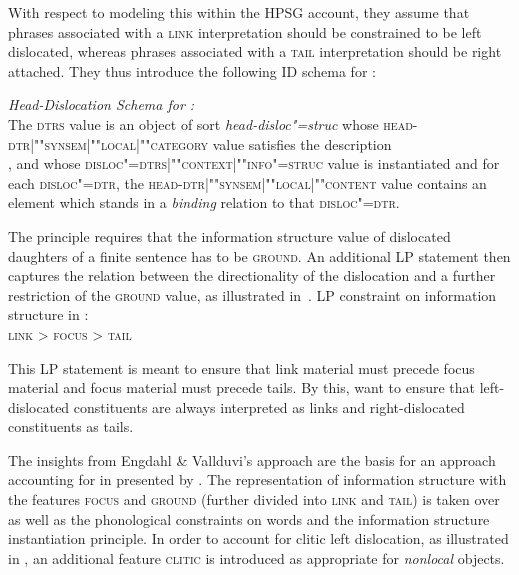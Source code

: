 \documentclass[output=paper
 	        ,biblatex
                ,babelshorthands
                ,newtxmath
                ,draftmode
                ,colorlinks, citecolor=brown
]{langscibook}
\begin{document}
With respect to modeling this within the HPSG account, they assume
that phrases associated with a \textsc{link} interpretation should be
constrained to be left dislocated, whereas phrases associated with a
\textsc{tail} interpretation should be right attached.
They thus introduce the following ID schema for :
\begin{sloppy}
\begin{exe}
\ex  \textit{Head-Dislocation Schema for :}\\
  The \textsc{dtrs} value is an object of sort
  \textit{head-disloc"=struc} whose
  \textsc{head-dtr|""syn\-sem|""local|""category} value satisfies the
  description\\
  , and whose
  \textsc{disloc"=dtrs|""context|""info"=struc} value is instantiated and
  for each \textsc{disloc"=dtr}, the
  \textsc{head-dtr|""synsem|""local|""content} value contains an element
  which stands in a \textit{binding} relation to that
  \textsc{disloc"=dtr}.
\end{exe}
\end{sloppy}

The principle requires that the information structure value of
dislocated daughters of a finite sentence has to be
\textsc{ground}. An additional LP statement then captures the relation
between the directionality of the dislocation and a further
restriction of the \textsc{ground} value, as illustrated in~.
\ea
LP constraint on information structure in   \citep{EV96a}:\\
  \centering
  \textsc{link} > \textsc{focus} > \textsc{tail}

  \label{fig:lp-catalan}
\z
This LP statement is meant to ensure that link material must precede
focus material and focus material must precede tails. By this,
\cite{EV96a} want to ensure that left-dislocated constituents are always
interpreted as links and right-dislocated constituents as tails.

The insights from Engdahl \& Vallduvi's approach are the basis for an
approach accounting for  in  presented by
\cite{AK2002a}. The representation of information structure with the
features \textsc{focus} and \textsc{ground} (further divided into
\textsc{link} and \textsc{tail}) is taken over as well as the
phonological constraints on words and the information structure
instantiation principle. In order to account for clitic left
dislocation, as illustrated in , an
additional feature \textsc{clitic} is introduced as appropriate for
\textit{nonlocal} objects.
\end{document}
